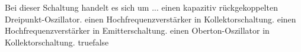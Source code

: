     { Bei dieser Schaltung handelt es sich um ...}
    {einen kapazitiv rückgekoppelten Dreipunkt-Oszillator.}
    {einen Hochfrequenzverstärker in Kollektorschaltung.}
    {einen Hochfrequenzverstärker in Emitterschaltung.}
    {einen Oberton-Oszillator in Kollektorschaltung.}
    {true}{false}